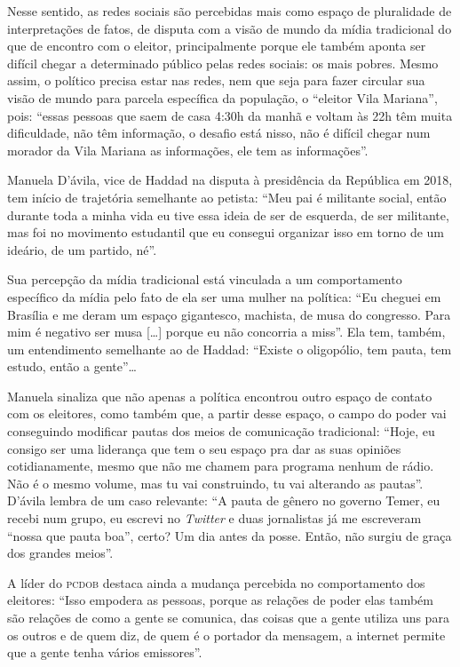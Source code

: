 Nesse sentido, as redes sociais são percebidas mais como espaço de
pluralidade de interpretações de fatos, de disputa com a visão de mundo
da mídia tradicional do que de encontro com o eleitor, principalmente
porque ele também aponta ser difícil chegar a determinado público pelas
redes sociais: os mais pobres. Mesmo assim, o político precisa estar nas
redes, nem que seja para fazer circular sua visão de mundo para parcela
específica da população, o ``eleitor Vila Mariana'', pois: ``essas
pessoas que saem de casa 4:30h da manhã e voltam às 22h têm muita
dificuldade, não têm informação, o desafio está nisso, não é difícil
chegar num morador da Vila Mariana as informações, ele tem as
informações''.

Manuela D'ávila, vice de Haddad na disputa à presidência da República em
2018, tem início de trajetória semelhante ao petista: ``Meu pai é
militante social, então durante toda a minha vida eu tive essa ideia de
ser de esquerda, de ser militante, mas foi no movimento estudantil que
eu consegui organizar isso em torno de um ideário, de um partido, né''.

Sua percepção da mídia tradicional está vinculada a um comportamento
específico da mídia pelo fato de ela ser uma mulher na política: ``Eu
cheguei em Brasília e me deram um espaço gigantesco, machista, de musa
do congresso. Para mim é negativo ser musa {[}\ldots{}{]} porque eu não
concorria a miss''. Ela tem, também, um entendimento semelhante ao de
Haddad: ``Existe o oligopólio, tem pauta, tem estudo, então a gente''\ldots{}

Manuela sinaliza que não apenas a política encontrou outro espaço de
contato com os eleitores, como também que, a partir desse espaço, o
campo do poder vai conseguindo modificar pautas dos meios de comunicação
tradicional: ``Hoje, eu consigo ser uma liderança que tem o seu espaço
pra dar as suas opiniões cotidianamente, mesmo que não me chamem para
programa nenhum de rádio. Não é o mesmo volume, mas tu vai construindo,
tu vai alterando as pautas''. D'ávila lembra de um caso relevante: ``A
pauta de gênero no governo Temer, eu recebi num grupo, eu escrevi no
\emph{Twitter} e duas jornalistas já me escreveram ``nossa que pauta
boa'', certo? Um dia antes da posse. Então, não surgiu de graça dos
grandes meios''.

A líder do \textsc{pcdob} destaca ainda a mudança percebida no comportamento
dos eleitores: ``Isso empodera as pessoas, porque as relações de poder
elas também são relações de como a gente se comunica, das coisas que a
gente utiliza uns para os outros e de quem diz, de quem é o portador da
mensagem, a internet permite que a gente tenha vários emissores''.

